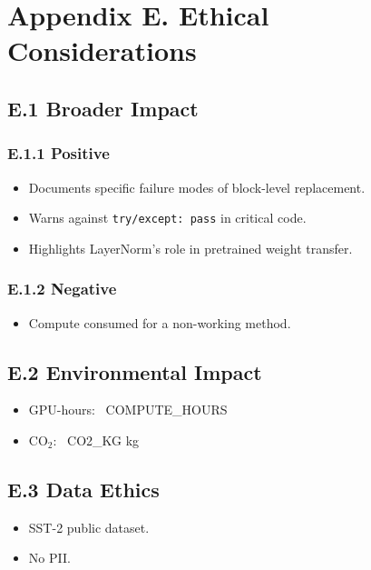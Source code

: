
\section{Appendix E. Ethical Considerations}

\subsection{E.1 Broader Impact}

\subsubsection{E.1.1 Positive}

\begin{itemize}
\item Documents specific failure modes of block-level replacement.
\item Warns against \texttt{try/except: pass} in critical code.
\item Highlights LayerNorm's role in pretrained weight transfer.

\end{itemize}
\subsubsection{E.1.2 Negative}

\begin{itemize}
\item Compute consumed for a non-working method.

\end{itemize}
\subsection{E.2 Environmental Impact}

\begin{itemize}
\item GPU-hours: ~{{COMPUTE\_HOURS}}
\item CO$_2$: ~{{CO2\_KG}} kg

\end{itemize}
\subsection{E.3 Data Ethics}

\begin{itemize}
\item SST-2 public dataset.
\item No PII.

\end{itemize}
